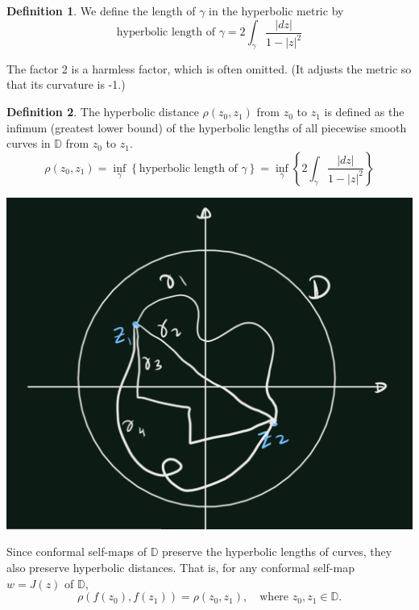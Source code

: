 \documentclass[
]{book}
\theoremstyle{definition}
\newtheorem{definition}{Definition}[chapter]
\theoremstyle{definition}
\theoremstyle{definition}
\theoremstyle{definition}
\theoremstyle{remark}
\begin{document}
\begin{definition}
\protect\hypertarget{def:unnamed-chunk-35}{}\label{def:unnamed-chunk-35}We define the length of \(\gamma\) in the hyperbolic metric by
\[\text{hyperbolic length of } \gamma =2\int_{\gamma} \frac{|dz|}{1-|z|^2}\]
\end{definition}

The factor 2 is a harmless factor, which is often omitted. (It adjusts the
metric so that its curvature is -1.)

\begin{definition}
\protect\hypertarget{def:unnamed-chunk-36}{}\label{def:unnamed-chunk-36}The hyperbolic distance \(\rho(z_0, z_1)\) from \(z_0\) to \(z_1\) is defined as the infimum (greatest lower bound) of the hyperbolic lengths of all piecewise smooth curves in \(\mathbb{D}\) from \(z_0\) to \(z_1\).
\[\rho(z_0, z_1)
  =\inf_\gamma\left\{\text{hyperbolic length of } \gamma \right\}
  =\inf_\gamma\left\{2\int_{\gamma} \frac{|dz|}{1-|z|^2}\right\}\]
\end{definition}

\begin{center}\includegraphics[width=14.76in]{figures/Riemann_Mapping_Therom/fig1} \end{center}

Since conformal self-maps of \(\mathbb{D}\) preserve the hyperbolic lengths of curves, they also preserve hyperbolic distances. That is, for any conformal self-map \(w = J(z)\) of \(\mathbb{D}\),
\[ \rho(f(z_0), f(z_1)) = \rho(z_0, z_1), \quad \text{where } z_0, z_1 \in \mathbb{D}. \]
\end{document}
